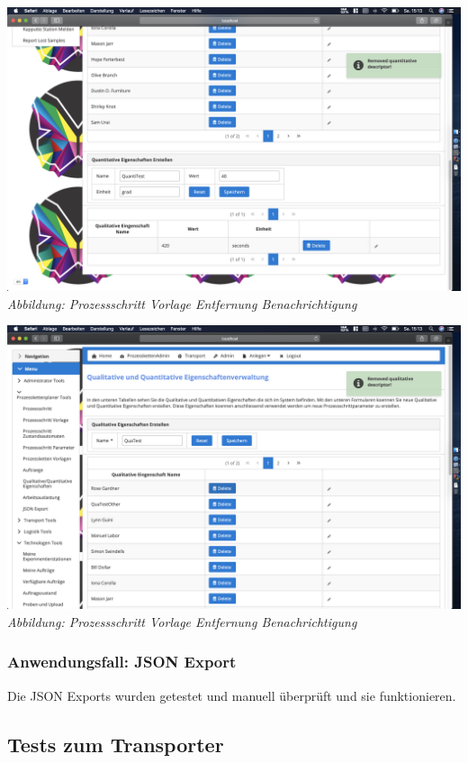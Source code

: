 \documentclass[enabledeprecatedfontcommands,fontsize=12pt,paper=a4,twoside]{scrartcl}
\begin{document}
\hypertarget{sc3.3.3.7}{
\includegraphics[width=1\textwidth]{Screenshots/336RemoveMeldungqt.png}
\textit{Abbildung: Prozessschritt Vorlage Entfernung Benachrichtigung}
}  
\hypertarget{sc3.3.3.7}{
\includegraphics[width=1\textwidth]{Screenshots/336RemoveMledungql.png}
\textit{Abbildung: Prozessschritt Vorlage Entfernung Benachrichtigung}
}  


\subsubsection{Anwendungsfall: JSON Export}

Die JSON Exports wurden getestet und manuell überprüft und sie funktionieren. 



\subsection{Tests zum Transporter}
\end{document}

